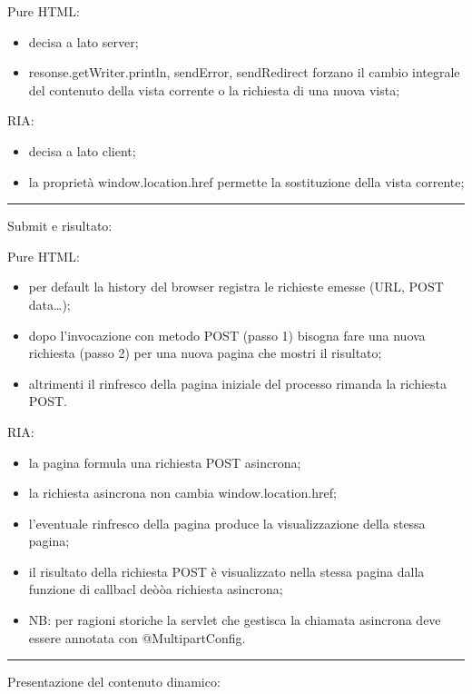 \begin{multicols}{2}
Pure HTML:
\begin{itemize}
    \item decisa a lato server;
    \item resonse.getWriter.println, sendError, sendRedirect forzano il cambio integrale del contenuto della vista corrente o la richiesta di una nuova vista;
\end{itemize}
\vfill\null
\columnbreak
RIA:
\begin{itemize}
    \item decisa a lato client;
    \item la proprietà window.location.href permette la sostituzione della vista corrente;
\end{itemize}
\end{multicols}
\rule{\textwidth}{0,4pt}
Submit e risultato:
\begin{multicols}{2}
Pure HTML:
\begin{itemize}
    \item per default la history del browser registra le richieste emesse (URL, POST data\dots);
    \item dopo l'invocazione con metodo POST (passo 1) bisogna fare una nuova richiesta (passo 2) per una nuova pagina che mostri il risultato;
    \item altrimenti il rinfresco della pagina iniziale del processo rimanda la richiesta POST.
\end{itemize}
\vfill\null
\columnbreak
RIA:
\begin{itemize}
    \item la pagina formula una richiesta POST asincrona;
    \item la richiesta asincrona non cambia window.location.href;
    \item l'eventuale rinfresco della pagina produce la visualizzazione della stessa pagina;
    \item il risultato della richiesta POST è visualizzato nella stessa pagina dalla funzione di callbacl deòòa richiesta asincrona;
    \item NB: per ragioni storiche la servlet che gestisca la chiamata asincrona deve essere annotata con @MultipartConfig.
\end{itemize}
\end{multicols}
\rule{\textwidth}{0,4pt}
Presentazione del contenuto dinamico:
